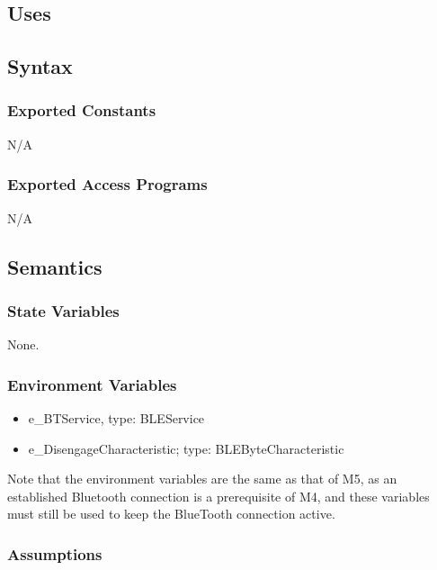 \documentclass[12pt, titlepage]{article}
\begin{document}
\subsection{Uses}


\subsection{Syntax}

\subsubsection{Exported Constants}

N/A

\subsubsection{Exported Access Programs}

N/A

\subsection{Semantics}

\subsubsection{State Variables}

None. 

\subsubsection{Environment Variables}


\begin{itemize}
\item e\_BTService, type: BLEService
\item e\_DisengageCharacteristic; type: BLEByteCharacteristic
\end{itemize}

Note that the environment variables are the same as that of M5, as an established Bluetooth connection is a prerequisite of M4, and these variables must still be used to keep the BlueTooth connection active. 

\subsubsection{Assumptions}
\end{document}
